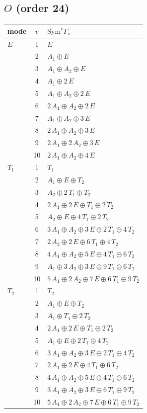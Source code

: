 \documentclass[11pt]{article}
\begin{document}
\subsection*{$O$ \quad (order 24)}
\begin{longtable}{l c p{}}
\hline mode & $v$ & $\mathrm{Sym}^v\Gamma_s$\\ \hline\endhead
$E$ & 1 & $E$\\
 & 2 & $A_{1}\oplus E$\\
 & 3 & $A_{1}\oplus A_{2}\oplus E$\\
 & 4 & $A_{1}\oplus 2\,E$\\
 & 5 & $A_{1}\oplus A_{2}\oplus 2\,E$\\
 & 6 & $2\,A_{1}\oplus A_{2}\oplus 2\,E$\\
 & 7 & $A_{1}\oplus A_{2}\oplus 3\,E$\\
 & 8 & $2\,A_{1}\oplus A_{2}\oplus 3\,E$\\
 & 9 & $2\,A_{1}\oplus 2\,A_{2}\oplus 3\,E$\\
 & 10 & $2\,A_{1}\oplus A_{2}\oplus 4\,E$\\
\hline
$T_{1}$ & 1 & $T_{1}$\\
 & 2 & $A_{1}\oplus E\oplus T_{2}$\\
 & 3 & $A_{2}\oplus 2\,T_{1}\oplus T_{2}$\\
 & 4 & $2\,A_{1}\oplus 2\,E\oplus T_{1}\oplus 2\,T_{2}$\\
 & 5 & $A_{2}\oplus E\oplus 4\,T_{1}\oplus 2\,T_{2}$\\
 & 6 & $3\,A_{1}\oplus A_{2}\oplus 3\,E\oplus 2\,T_{1}\oplus 4\,T_{2}$\\
 & 7 & $2\,A_{2}\oplus 2\,E\oplus 6\,T_{1}\oplus 4\,T_{2}$\\
 & 8 & $4\,A_{1}\oplus A_{2}\oplus 5\,E\oplus 4\,T_{1}\oplus 6\,T_{2}$\\
 & 9 & $A_{1}\oplus 3\,A_{2}\oplus 3\,E\oplus 9\,T_{1}\oplus 6\,T_{2}$\\
 & 10 & $5\,A_{1}\oplus 2\,A_{2}\oplus 7\,E\oplus 6\,T_{1}\oplus 9\,T_{2}$\\
\hline
$T_{2}$ & 1 & $T_{2}$\\
 & 2 & $A_{1}\oplus E\oplus T_{2}$\\
 & 3 & $A_{1}\oplus T_{1}\oplus 2\,T_{2}$\\
 & 4 & $2\,A_{1}\oplus 2\,E\oplus T_{1}\oplus 2\,T_{2}$\\
 & 5 & $A_{1}\oplus E\oplus 2\,T_{1}\oplus 4\,T_{2}$\\
 & 6 & $3\,A_{1}\oplus A_{2}\oplus 3\,E\oplus 2\,T_{1}\oplus 4\,T_{2}$\\
 & 7 & $2\,A_{1}\oplus 2\,E\oplus 4\,T_{1}\oplus 6\,T_{2}$\\
 & 8 & $4\,A_{1}\oplus A_{2}\oplus 5\,E\oplus 4\,T_{1}\oplus 6\,T_{2}$\\
 & 9 & $3\,A_{1}\oplus A_{2}\oplus 3\,E\oplus 6\,T_{1}\oplus 9\,T_{2}$\\
 & 10 & $5\,A_{1}\oplus 2\,A_{2}\oplus 7\,E\oplus 6\,T_{1}\oplus 9\,T_{2}$\\
\hline
\end{longtable}
\end{document}
